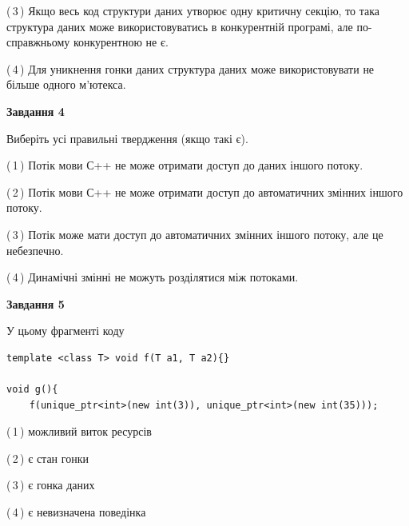 \documentclass[12pt, ukrainian]{article}
\begin{document}
\begin {large}
{(\,3\,) Якщо весь код структури даних утворює одну критичну секцію, то така структура даних може використовуватись в конкурентній програмі, але по-справжньо\-му конкурентною не є.%

(\,4\,) Для уникнення гонки даних структура даних може використовувати не більше одного м’ютекса.%



\begin{center}
\textbf{Завдання 4}
\end{center}
Виберіть усі правильні твердження (якщо такі є).\par
\vspace{2mm}

(\,1\,) Потік мови С++ не може отримати доступ до даних іншого потоку.%

(\,2\,) Потік мови С++ не може отримати доступ до автоматичних змінних іншого потоку.%

(\,3\,) Потік може мати доступ до автоматичних змінних іншого потоку, але це небезпечно.%

(\,4\,) Динамічні змінні не можуть розділятися між потоками.%



\begin{center}
\textbf{Завдання 5}
\end{center}
У цьому фрагменті коду
\begin{verbatim}
template <class T> void f(T a1, T a2){}

void g(){
    f(unique_ptr<int>(new int(3)), unique_ptr<int>(new int(35)));
\end{verbatim}

(\,1\,) можливий виток ресурсів%

(\,2\,) є стан гонки%

(\,3\,) є гонка даних%

(\,4\,) є невизначена поведінка%


}
\end {large}
\end{document}
